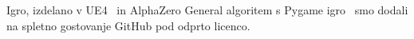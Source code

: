 \documentclass[a4paper, 12pt]{book}
\begin{document}
Igro, izdelano v UE4~\cite{td2020} in AlphaZero General algoritem s Pygame igro~\cite{pygameAlphaZeroGeneral} smo dodali na spletno gostovanje GitHub pod odprto licenco.

\newpage %
\ \\
\clearpage
{}


\end{document}
